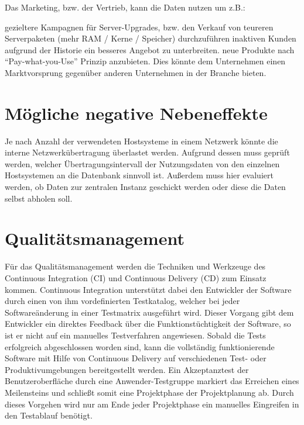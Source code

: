 Das Marketing, bzw. der Vertrieb, kann die Daten nutzen um z.B.:
\begin{outline}
  \1 gezieltere Kampagnen für Server-Upgrades, bzw. den Verkauf von teureren
  Serverpaketen (mehr RAM / Kerne / Speicher) durchzuführen
  \1 inaktiven Kunden aufgrund der Historie ein besseres Angebot zu
  unterbreiten.
  \1 neue Produkte nach “Pay-what-you-Use” Prinzip anzubieten. Dies könnte dem
  Unternehmen einen Marktvorsprung gegenüber anderen Unternehmen in der
  Branche bieten.
\end{outline}

\section{Mögliche negative Nebeneffekte}

Je nach Anzahl der verwendeten Hostsysteme in einem Netzwerk könnte die interne
Netzwerkübertragung überlastet werden. Aufgrund dessen muss geprüft werden,
welcher Übertragungsintervall der Nutzungsdaten von den einzelnen Hostsystemen
an die Datenbank sinnvoll ist. Außerdem muss hier evaluiert werden, ob Daten
zur zentralen Instanz geschickt werden oder diese die Daten selbst abholen
soll.

\section{Qualitätsmanagement}
Für das Qualitätsmanagement werden die Techniken und Werkzeuge des Continuous
Integration (CI) und Continuous Delivery (CD) zum Einsatz kommen. Continuous
Integration unterstützt dabei den Entwickler der Software durch einen von ihm
vordefinierten Testkatalog, welcher bei jeder Softwareänderung in einer
Testmatrix ausgeführt wird. Dieser Vorgang gibt dem Entwickler ein direktes
Feedback über die Funktionstüchtigkeit der Software, so ist er nicht auf ein
manuelles Testverfahren angewiesen. Sobald die Tests erfolgreich abgeschlossen
worden sind, kann die vollständig funktionierende Software mit Hilfe von
Continuous Delivery auf verschiedenen Test- oder Produktivumgebungen
bereitgestellt werden. Ein Akzeptanztest der Benutzeroberfläche durch eine
Anwender-Testgruppe markiert das Erreichen eines Meilensteins und schließt
somit eine Projektphase der Projektplanung ab. Durch dieses Vorgehen wird nur
am Ende jeder Projektphase ein manuelles Eingreifen in den Testablauf benötigt.


